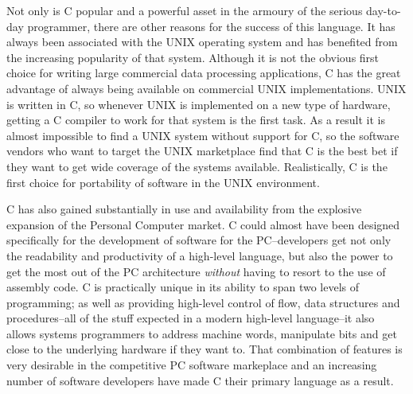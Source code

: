   Not only is C popular and a powerful asset in the armoury of the serious
   day-to-day programmer, there are other reasons for the success of this
   language. It has always been associated with the UNIX operating system and
   has benefited from the increasing popularity of that system. Although it is
   not the obvious first choice for writing large commercial data processing
   applications, C has the great advantage of always being available on
   commercial UNIX implementations. UNIX is written in C, so whenever
   UNIX is implemented on a new type of hardware, getting a C compiler to work
   for that system is the first task. As a result it is almost impossible to
   find a UNIX system without support for C, so the software vendors who
   want to target the UNIX marketplace find that C is the best bet if they
   want to get wide coverage of the systems available. Realistically,
   C is the first choice for portability of software in the UNIX
   environment.


  C has also gained substantially in use and availability from the
   explosive expansion of the Personal Computer market. C could almost
   have been designed specifically for the development of software for the
   PC--developers get not only the readability and productivity of a
   high-level language, but also the power to get the most out of the PC
   architecture \textit{without} having to resort to the use of assembly code.
   C is practically unique in its ability to span two levels of
   programming; as well as providing high-level control of flow, data
   structures and procedures--all of the stuff expected in a modern
   high-level language--it also allows systems programmers to address
   machine words, manipulate bits and get close to the underlying hardware if
   they want to. That combination of features is very desirable in the
   competitive PC software markeplace and an increasing number of software
   developers have made C their primary language as a result.


